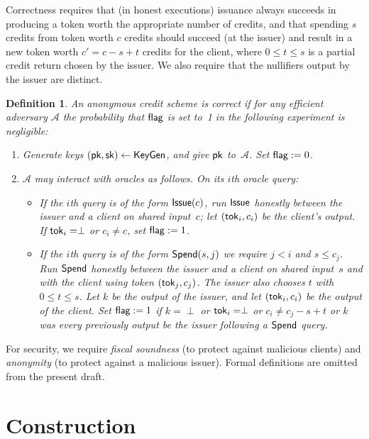 \documentclass[11pt]{article}
\newtheorem{definition}{Definition}
\def\A{{\mathcal A}}
\def\issue{{\sf Issue}}
\def\keygen{{\sf KeyGen}}
\def\pk{{\sf pk}}
\def\sk{{\sf sk}}
\def\tok{{\sf tok}}
\def\spend{{\sf Spend}}
\def\flag{{\sf flag}}
\begin{document}
Correctness requires that (in honest executions) issuance always succeeds in producing a token worth the appropriate number of credits, and that spending $s$ credits from token worth $c$ credits should succeed (at the issuer) and result in a new token worth $c'=c-s+t$ credits for the client, where $0 \leq t \leq s$ is a partial credit return chosen by the issuer.
We also require that the nullifiers output by the issuer are distinct.

\begin{definition}
An anonymous credit scheme is {\sf correct} if for any efficient adversary $\A$ the probability that $\flag$ is set to~1 in the following experiment is negligible:
\begin{enumerate}
    \item Generate  keys $(\pk, \sk) \leftarrow \keygen$, and give $\pk$ to~$\A$. Set $\flag:=0$.
    \item $\A$ may interact with oracles as follows. On its $i$th oracle query:
    \begin{itemize}
        \item If the $i$th query is of the form $\issue(c)$, run $\issue$ honestly between the issuer and a client on shared input~$c$; let $(\tok_i, c_i)$ be the client's output.
        If $\tok_i=\perp$ or $c_i\neq c$, set $\flag:=1$.
        
        \item If the $i$th query is of the form $\spend(s, j)$ we require $j < i$ and $s \leq c_j$.
        Run $\spend$ honestly between the issuer and a client on shared input~$s$ and with the client using token $(\tok_j, c_j)$. The issuer also chooses $t$ with $0 \leq t \leq s$. Let $k$ be the output of the issuer, and let $(\tok_i, c_i)$ be the output of the client. Set $\flag:=1$ if $k=\perp$ or $\tok_i=\perp$ or $c_i \neq c_j-s+t$ or $k$ was every previously output be the issuer following a $\spend$ query.
    \end{itemize}
\end{enumerate}
\end{definition}

For security, we require \emph{fiscal soundness} (to protect against malicious clients) and \emph{anonymity} (to protect against a malicious issuer). 
Formal definitions are omitted from the present draft.

\section{Construction}
\end{document}
